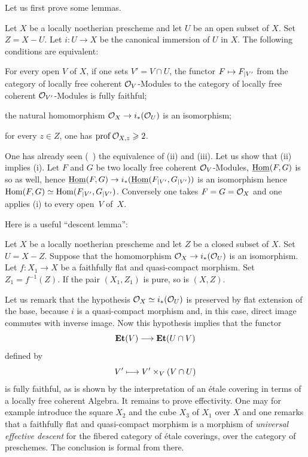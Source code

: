 Let us first prove some lemmas.

\begin{lemma} \label{X.3.5}
Let $X$ be a locally noetherian prescheme and let $U$ be an open subset
of $X$. Set $Z=X-U$. Let $i\colon U\to X$ be the canonical immersion of
$U$ in $X$. The following conditions are equivalent:
\begin{enumeratei}
\item
For every open $V$ of $X$, if one sets $V'=V\cap U$, the functor
$F\mto F_{|V'}$ from the category of locally free coherent
${\mathcal O}_V$-Modules to the category of locally free coherent
${\mathcal O}_{{V'}}$-Modules is fully faithful;

\item
the natural homomorphism $\OX \to i_\ast(\Oo_{U})$ is an isomorphism;

\item
for every $z\in Z$, one has $\operatorname{prof}{\mathcal O}_{X, z}\geqslant 2$.
\end{enumeratei}
\end{lemma}

One has already seen (~) the equivalence of (ii)
and (iii). Let us show that (ii) implies (i). Let $F$ and $G$ be two
locally free coherent ${\mathcal O}_V$-Modules, $\operatorname{\underline{Hom}}(F, G)$ is so as well,
hence $\SheafHom(F, G)\to i_\ast(\SheafHom(F_{|V'}, G_{|V'}))$ is an
isomorphism hence $\operatorname{Hom}(F, G)\simeq\operatorname{Hom}(F_{|V'}, G_{|V'})$. Conversely
one takes $F=G=\mathcal{O}_X$ and one applies (i) to every open~$V$ of~$X$.

Here is a useful ``descent lemma'':

\begin{lemma} \label{X.3.6} Let $X$ be a locally noetherian prescheme and let $Z$ be a closed subset of $X$. Set $U=X-Z$. Suppose that the homomorphism $\OX \to i_\ast(\Oo_U)$ is an isomorphism. Let $f\colon X_1\to X$ be a faithfully flat and quasi-compact morphism. Set $Z_1=f^{-1}(Z)$. If the pair $(X_1, Z_1)$ is pure, so is $(X, Z)$.
\end{lemma}

Let us remark that the hypothesis $\mathcal{O}_X\simeq i_\ast({\mathcal O}_U)$ is
preserved by flat extension of the base, because $i$ is a quasi-compact
morphism and, in this case, direct image commutes with inverse image.
Now this hypothesis implies that the functor
\[
\Et(V) \to \Et(U\cap V)
\]
defined by
\[
V'\mto V'\times_V(V\cap U)
\]
is fully faithful, as is shown by the interpretation of an \'etale
covering in terms of a locally free coherent Algebra. It remains to
prove effectivity. One may for example introduce the square $X_2$ and
the cube $X_3$ of $X_1$ over $X$ and one remarks that a faithfully flat
and quasi-compact morphism is a morphism of \emph{universal effective
descent} for the fibered category of \'etale coverings, over the
category of preschemes. The conclusion is formal from
there.

